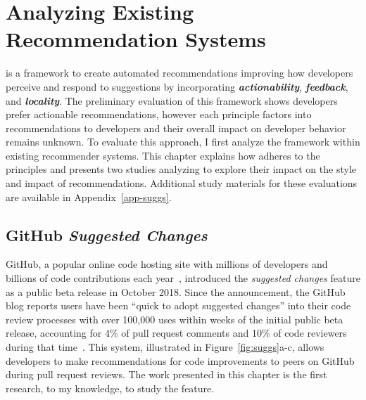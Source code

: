 \chapter{Analyzing Existing Recommendation Systems}
\label{chap-suggs}

\Framework is a framework to create automated recommendations improving how developers perceive and respond to suggestions by incorporating \textbf{\em actionability}, \textbf{\em feedback}, and \textbf{\em locality}. The preliminary evaluation of this framework shows developers prefer actionable recommendations, however each principle factors into recommendations to developers and their overall impact on developer behavior remains unknown. To evaluate this approach, I first analyze the framework within existing recommender systems. This chapter explains how \suggs adheres to the \framework principles and presents two studies analyzing \sugg to explore their impact on the style and impact of recommendations. Additional study materials for these evaluations are available in Appendix~\ref{app-suggs}.

\section{GitHub \textit{Suggested Changes}}
\label{sec-suggs}

GitHub, a popular online code hosting site with millions of developers and billions of code contributions each year~\cite{Octoverse}, introduced the \textsl{suggested changes} feature as a public beta release in October 2018. Since the announcement, the GitHub blog reports users have been ``quick to adopt suggested changes'' into their code review processes with over 100,000 uses within weeks of the initial public beta release, accounting for 4\% of pull request comments and 10\% of code reviewers during that time~\cite{SuggestedChanges2}. This system, illustrated in Figure~\ref{fig:suggs}a-c, allows developers to make recommendations for code improvements to peers on GitHub during pull request reviews. The work presented in this chapter is the first research, to my knowledge, to study the \suggs feature.

